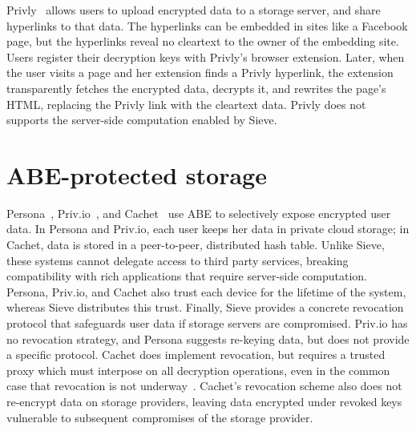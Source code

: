 Privly~\cite{privly} allows users to upload
encrypted data to a storage server, and share
hyperlinks to that data. The hyperlinks can be
embedded in sites like a Facebook page, but
the hyperlinks reveal no cleartext to the
owner of the embedding site. Users register
their decryption keys with Privly's browser
extension. Later, when the user visits a page
and her extension finds a Privly hyperlink,
the extension transparently fetches the
encrypted data, decrypts it, and rewrites
the page's HTML, replacing the Privly link
with the cleartext data. Privly does not supports
the server-side computation enabled
by Sieve.

\section{ABE-protected storage} 
Persona~\cite{persona},
Priv.io~\cite{privio}, and Cachet~\cite{cachet}
use ABE to selectively expose encrypted user data.
In Persona and Priv.io, each user keeps her data
in private cloud storage; in Cachet, data is
stored in a peer-to-peer, distributed hash table.
Unlike Sieve, these systems cannot delegate access
to third party services, breaking compatibility
with rich applications that require server-side
computation.
Persona, Priv.io, and Cachet also trust each device
for the  lifetime of the system, whereas Sieve
distributes this trust. Finally, Sieve provides a
concrete revocation protocol that safeguards user
data if storage servers are compromised. Priv.io
has no revocation strategy, and Persona suggests
re-keying data, but does not provide a specific
protocol. Cachet does implement revocation, but
requires a trusted proxy which must interpose on
all decryption operations, even in the common case
that revocation is not underway~\cite{easier}.
Cachet's revocation scheme also does not re-encrypt
data on storage providers, leaving data encrypted
under revoked keys vulnerable to subsequent
compromises of the storage provider.

